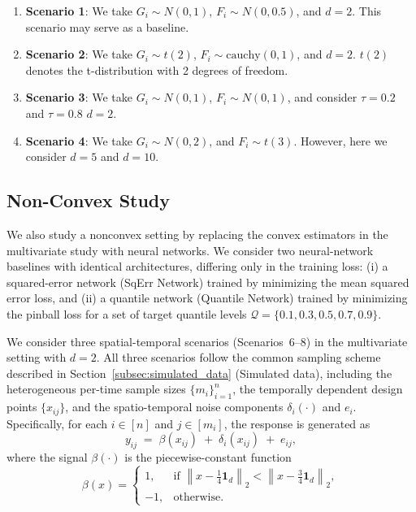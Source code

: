 \documentclass[twoside,11pt]{article}
\newcommand{\rev}[1]{{\color{revisionred}#1}}
\begin{document}
\begin{enumerate}
    
\item \textbf{Scenario 1}: We take $G_i\sim N(0, 1)$, $F_i\sim N(0, 0.5)$, and $d=2$. This scenario may serve as a baseline. 

\item \textbf{Scenario 2}: We take $G_i\sim t(2)$, $F_i\sim \text{cauchy}(0, 1)$, and $d=2$. $t(2)$ denotes the t-distribution with 2 degrees of freedom. 

\item \textbf{Scenario 3}: We take $G_i\sim N(0, 1)$, $F_i\sim N(0, 1)$, and consider $\tau = 0.2$ and $\tau = 0.8$ $d=2$. 


\item \textbf{Scenario 4}: We take $G_i\sim N(0, 2)$, and $F_i\sim t(3)$. However, here we consider $d = 5$ and $d = 10$. 

\end{enumerate}


\subsection{Non-Convex Study}

\rev{We also study a nonconvex setting} by replacing the convex estimators in the multivariate study with neural networks. 
We consider two neural-network baselines with identical architectures, differing only in the training loss:
(i) a squared-error network (SqErr Network) trained by minimizing the mean squared error loss, and 
(ii) a quantile network (Quantile Network) trained by minimizing the pinball loss for a set of target quantile levels 
$\mathcal{Q}=\{0.1,0.3,0.5,0.7,0.9\}$.


We consider three spatial-temporal scenarios (Scenarios~6--8) in the multivariate setting with $d=2$.
All three scenarios follow the common sampling scheme described in Section~\ref{subsec:simulated_data} (Simulated data), 
including the heterogeneous per-time sample sizes $\{m_i\}_{i=1}^n$, the temporally dependent design points $\{x_{ij}\}$, 
and the spatio-temporal noise components $\delta_i(\cdot)$ and $e_i$.
Specifically, for each $i\in[n]$ and $j\in[m_i]$, the response is generated as
\begin{equation}\label{eq:st_yij}
y_{ij} \;=\; \beta(x_{ij}) \;+\; \delta_i(x_{ij}) \;+\; e_{ij},
\end{equation}
where the signal $\beta(\cdot)$ is the piecewise-constant function
\begin{equation}\label{eq:st_beta_piecewise}
\beta(x)=
\begin{cases}
1, & \text{if } \left\|x-\frac14\mathbf{1}_d\right\|_2 < \left\|x-\frac34\mathbf{1}_d\right\|_2,\\
-1, & \text{otherwise}.
\end{cases}
\end{equation}
\end{document}
